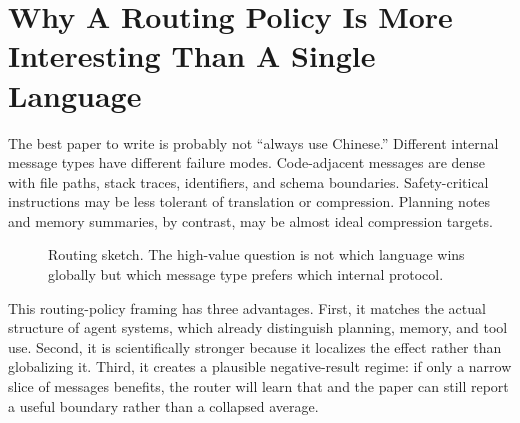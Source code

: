 \documentclass[11pt]{article}
\begin{document}
\section{Why A Routing Policy Is More Interesting Than A Single Language}

The best paper to write is probably not ``always use Chinese.'' Different internal message types have different failure modes. Code-adjacent messages are dense with file paths, stack traces, identifiers, and schema boundaries. Safety-critical instructions may be less tolerant of translation or compression. Planning notes and memory summaries, by contrast, may be almost ideal compression targets.

\begin{figure}[!htbp]
\centering
{}
\caption{Routing sketch. The high-value question is not which language wins globally but which message type prefers which internal protocol.}
\label{fig:router}
\end{figure}

This routing-policy framing has three advantages. First, it matches the actual structure of agent systems, which already distinguish planning, memory, and tool use. Second, it is scientifically stronger because it localizes the effect rather than globalizing it. Third, it creates a plausible negative-result regime: if only a narrow slice of messages benefits, the router will learn that and the paper can still report a useful boundary rather than a collapsed average.
\end{document}

